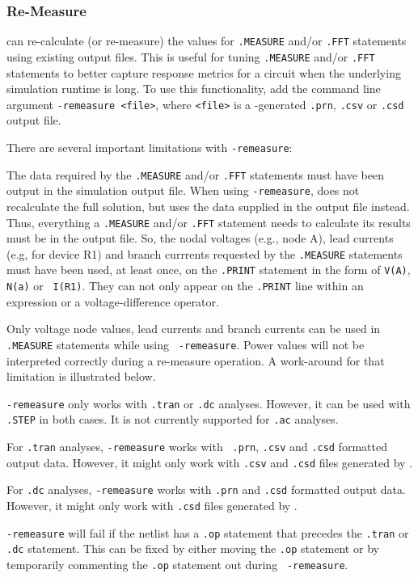 \subsubsection{Re-Measure}
\label{Measure_ReMeasure}
\Xyce{} can re-calculate (or re-measure) the values for {\tt .MEASURE} and/or
{\tt .FFT} statements using existing \Xyce{} output files.  This is useful for
tuning {\tt .MEASURE} and/or {\tt .FFT} statements to better capture response
metrics for a circuit when the underlying simulation runtime is long.  To use this
functionality, add the command line argument {\tt -remeasure <file>},
where {\tt <file>} is a \Xyce{}-generated {\tt .prn}, {\tt .csv} or
{\tt .csd} output file.

There are several important limitations with {\tt -remeasure}:
\begin{XyceItemize}

  \item The data required by the {\tt .MEASURE} and/or {\tt .FFT} statements
   must have been output in the simulation output file.  When using
  {\tt -remeasure}, \Xyce{} does not recalculate the full solution, but
  uses the data supplied in the output file instead.  Thus, everything
  a {\tt .MEASURE} and/or {\tt .FFT} statement needs to calculate its results
  must be in the output file.  So, the nodal voltages (e.g., node A), lead
  currents (e.g, for device R1) and branch currrents requested by the
  {\tt .MEASURE} statements must have been used, at least once, on the
  {\tt .PRINT} statement in the form of {\tt V(A)}, {\tt N(a)} or {\tt
  I(R1)}.  They can not only appear on the {\tt .PRINT} line within an
  expression or a voltage-difference operator.

  \item Only voltage node values, lead currents and branch currents
  can be used in {\tt .MEASURE} statements while using {\tt
  -remeasure}.  Power values will not be interpreted correctly during
  a re-measure operation.  A work-around for that limitation is
  illustrated below.

  \item {\tt -remeasure} only works with {\tt .tran} or {\tt .dc}
  analyses.  However, it can be used with {\tt .STEP} in both
  cases. It is not currently supported for {\tt .ac} analyses.

  \item For {\tt .tran} analyses, {\tt -remeasure} works with {\tt
  .prn}, {\tt .csv} and {\tt .csd} formatted output data.  However, it
  might only work with {\tt .csv} and {\tt .csd} files generated
  by \Xyce{}.  \item For {\tt .dc} analyses, {\tt -remeasure} works
  with {\tt .prn} and {\tt .csd} formatted output data.  However, it
  might only work with {\tt .csd} files generated by \Xyce{}.

  \item {\tt -remeasure} will fail if the netlist has a {\tt .op}
  statement that precedes the {\tt .tran} or {\tt .dc} statement.
  This can be fixed by either moving the {\tt .op} statement or by
  temporarily commenting the {\tt .op} statement out during {\tt
  -remeasure}.
\end{XyceItemize}

